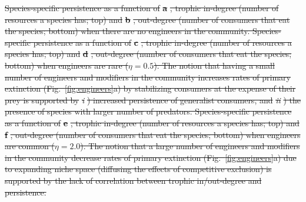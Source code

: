 \documentclass[twocolumn,preprintnumbers,amsmath,amssymb,superscriptaddress,linenumbers]{revtex4-1}
\providecommand{\DIFdel}[1]{{\protect\color{red}\sout{#1}}}                      %
\providecommand{\DIFdelFL}[1]{\DIFdel{#1}} %
\begin{document}
{%
\DIFdelFL{Species-specific persistence as a function of }\textbf{\DIFdelFL{a}}%
\DIFdelFL{, trophic in-degree (number of resources a species has; top) and }\textbf{\DIFdelFL{b}}%
\DIFdelFL{, out-degree (number of consumers that eat the species; bottom) when there are no engineers in the community. 
Species-specific persistence as a function of }\textbf{\DIFdelFL{c}}%
\DIFdelFL{, trophic in-degree (number of resources a species has; top) and }\textbf{\DIFdelFL{d}}%
\DIFdelFL{, out-degree (number of consumers that eat the species; bottom) when engineers are rare ($\eta = 0.5$).
The notion that having a small number of engineers and modifiers in the community increases rates of primary extinction (Fig.\ \ref{fig:engineers}a) by stabilizing consumers at the expense of their prey is supported by }\emph{\DIFdelFL{i}}%
\DIFdelFL{) increased persistence of generalist consumers, and }\emph{\DIFdelFL{ii}}%
\DIFdelFL{) the presence of species with larger number of predators.
Species-specific persistence as a function of }\textbf{\DIFdelFL{e}}%
\DIFdelFL{, trophic in-degree (number of resources a species has; top) and }\textbf{\DIFdelFL{f}}%
\DIFdelFL{, out-degree (number of consumers that eat the species; bottom) when engineers are common ($\eta = 2.0$).
The notion that a large number of engineers and modifiers in the community decrease rates of primary extinction (Fig.\ \ref{fig:engineers}a) due to expanding niche space (diffusing the effects of competitive exclusion) is supported by the lack of correlation between trophic in/out-degree and persistence.
}}

\end{document}
